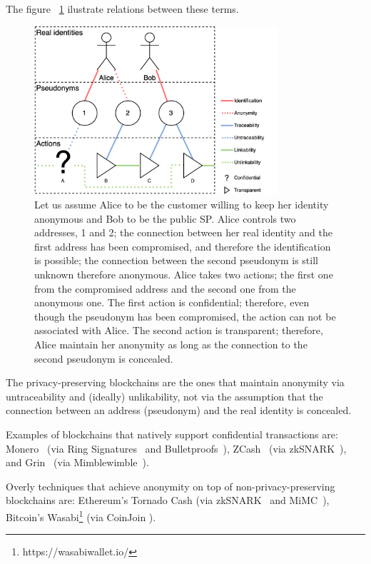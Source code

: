 \documentclass{ieeeaccess}
\begin{document}
The figure ~\ref{fig:anonymity-diagram} ilustrate relations between these terms.

\begin{figure}[h!]
\includegraphics[width=9cm]{anonymity-diagram.png}
\centering
\caption{Let us assume Alice to be the customer willing to keep her identity anonymous and Bob to be the public SP. Alice controls two addresses, 1 and 2; the connection between her real identity and the first address has been compromised, and therefore the identification is possible; the connection between the second pseudonym is still unknown therefore anonymous. Alice takes two actions; the first one from the compromised address and the second one from the anonymous one. The first action is confidential; therefore, even though the pseudonym has been compromised, the action can not be associated with Alice. The second action is transparent; therefore, Alice maintain her anonymity as long as the connection to the second pseudonym is concealed.}

\label{fig:anonymity-diagram}
\end{figure}

The privacy-preserving blockchains are the ones that maintain anonymity via untraceability and (ideally) unlikability, not via the assumption that the connection between an address (pseudonym) and the real identity is concealed.   

Examples of blockchains that natively support confidential transactions are: Monero~\cite{vansaberhagenCryptoNote2013} (via Ring Signatures~\cite{noetherRingSignatureConfidential2015} and Bulletproofs~\cite{moneroBulletproofsMoneropediaMonero, bunzBulletproofsShortProofs2018}), ZCash~\cite{ben-sassonZerocashDecentralizedAnonymous2014} (via zkSNARK~\cite{ben-sassonSNARKsVerifyingProgram2013}), and Grin~\cite{fuchsbauerAggregateCashSystems2019} (via Mimblewimble~\cite{jedusorMIMBLEWIMBLE2016}).

Overly techniques that achieve anonymity on top of non-privacy-preserving blockchains are: Ethereum's Tornado Cash\cite{pertsevTornadoCashPrivacy2019} (via zkSNARK~\cite{grothSizePairingbasedNoninteractive2016} and MiMC~\cite{albrechtMiMCEfficientEncryption2016}), Bitcoin's Wasabi\footnote{https://wasabiwallet.io/} (via CoinJoin \cite{maxwellCoinJoinBitcoinPrivacy2013}).
\end{document}
